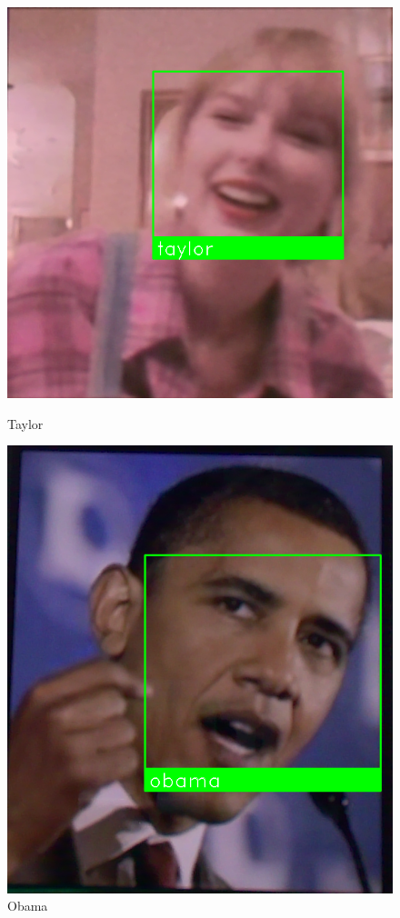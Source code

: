 \documentclass[UTF8]{article}
\begin{document}
\begin{figure}[htbp]
	\centering
	\begin{minipage}{0.49\linewidth}
		\centering
		\includegraphics[width=0.9\linewidth]{figure/效果展示.png}
		\caption{Taylor}
	\end{minipage}
	\begin{minipage}{0.49\linewidth}
		\centering
		\includegraphics[width=0.8\linewidth]{figure/效果展示3.png}
		\caption{Obama}
	\end{minipage}
\end{figure}
\end{document}
